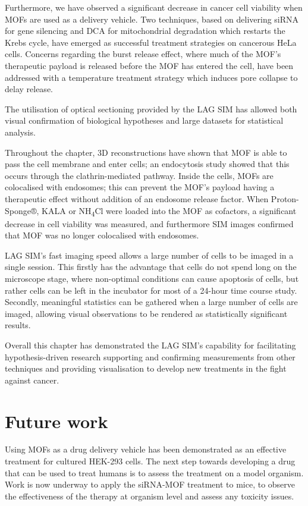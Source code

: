 Furthermore, we have observed a significant decrease in cancer cell viability when MOFs are used as a delivery vehicle. 
Two techniques, based on delivering siRNA for gene silencing and DCA for mitochondrial degradation which restarts the Krebs cycle, have emerged as successful treatment strategies on cancerous HeLa cells. 
Concerns regarding the burst release effect, where much of the MOF's therapeutic payload is released before the MOF has entered the cell, have been addressed with a temperature treatment strategy which induces pore collapse to delay release. 

The utilisation of optical sectioning provided by the LAG SIM has allowed both visual confirmation of biological hypotheses and large datasets for statistical analysis. 

Throughout the chapter, 3D reconstructions have shown that MOF is able to pass the cell membrane and enter cells; an endocytosis study showed that this occurs through the clathrin-mediated pathway. 
Inside the cells, MOFs are colocalised with endosomes; this can prevent the MOF's payload having a therapeutic effect without addition of an endosome release factor. 
When Proton-Sponge®, KALA or NH\textsubscript{4}Cl were loaded into the MOF as cofactors, a significant decrease in cell viability was measured, and furthermore SIM images confirmed that MOF was no longer colocalised with endosomes. 

LAG SIM's fast imaging speed allows a large number of cells to be imaged in a single session. 
This firstly has the advantage that cells do not spend long on the microscope stage, where non-optimal conditions can cause apoptosis of cells, but rather cells can be left in the incubator for most of a 24-hour time course study. 
Secondly, meaningful statistics can be gathered when a large number of cells are imaged, allowing visual observations to be rendered as statistically significant results.

Overall this chapter has demonstrated the LAG SIM's capability for facilitating hypothesis-driven research supporting and confirming measurements from other techniques and providing visualisation to develop new treatments in the fight against cancer. 

\section{Future work}
Using MOFs as a drug delivery vehicle has been demonstrated as an effective treatment for cultured HEK-293 cells. 
The next step towards developing a drug that can be used to treat humans is to assess the treatment on a model organism. 
Work is now underway to apply the siRNA-MOF treatment to mice, to observe the effectiveness of the therapy at organism level and assess any toxicity issues. 

